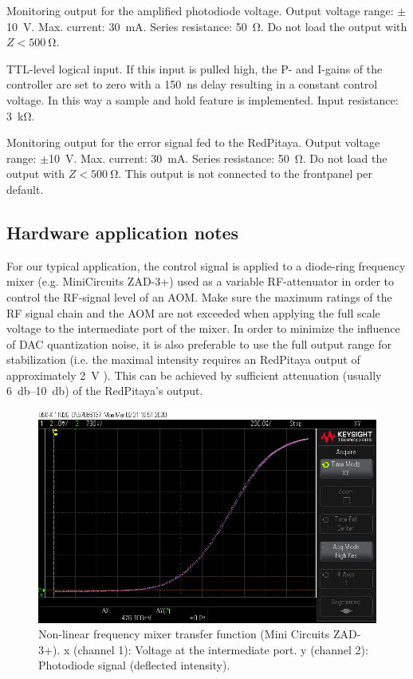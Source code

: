 \documentclass[twoside,a4paper]{refart}
\begin{document}
Monitoring output for the amplified photodiode voltage. Output voltage range: $\pm$\SI{10}{\volt}. Max. current: \SI{30}{\milli\ampere}. Series resistance: \SI{50}{\ohm}. Do not load the output with $Z < \SI{500}{\ohm}$.

TTL-level logical input. If this input is pulled high, the P- and I-gains of the controller are set to zero with a \SI{150}{\nano\second} delay resulting in a constant control voltage. In this way a sample and hold feature is implemented. Input resistance: \SI{3}{\kilo\ohm}.

 
Monitoring output for the error signal fed to the RedPitaya. Output voltage range: $\pm$\SI{10}{\volt}. Max. current: \SI{30}{\milli\ampere}. Series resistance: \SI{50}{\ohm}. Do not load the output with $Z < \SI{500}{\ohm}$. This output is not connected to the frontpanel per default.



\subsection{Hardware application notes \label{sec:app_note}}



 
For our typical application, the control signal is applied to a diode-ring frequency mixer (e.g. MiniCircuits ZAD-3+) used as a variable RF-attenuator in order to control the RF-signal level of an AOM. Make sure the maximum ratings of the RF signal chain and the AOM are not exceeded when applying the full scale voltage to the intermediate port of the mixer. In order to minimize the influence of DAC quantization noise, it is also preferable to use the full output range for stabilization (i.e. the maximal intensity requires an RedPitaya output of approximately \SI{2}{\volt} ). This can be achieved by sufficient attenuation (usually \SIrange{6}{10}{\decibel}) of the RedPitaya's output.

\begin{figure}[H]
	\includegraphics[width=\textwidth]{fig/mixer.png}
	\caption{Non-linear frequency mixer transfer function (Mini Circuits ZAD-3+). x (channel 1): Voltage at the intermediate port. y (channel 2): Photodiode signal (deflected intensity).  \label{fig:ZAD3}}
\end{figure} 
\end{document}
